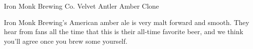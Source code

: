 \begin{recipe}{Iron Monk Brewing Co. Velvet Antler Amber Clone}

\begin{aboutblock}
Iron Monk Brewing's American amber ale is very malt forward and smooth. They
hear from fans all the time that this is their all-time favorite beer, and we think
you’ll agree once you brew some yourself. \sourceaha
\end{aboutblock}


\begin{methodandtiming}
 
\begin{mashsteps}
\end{mashsteps}

\begin{fermentationsteps}
\end{fermentationsteps}

\end{methodandtiming}

\recipebreak

\begin{ingredientsblock}

\begin{malts}
\end{malts}

\begin{hops}
\end{hops}


\end{ingredientsblock}

\end{recipe}

